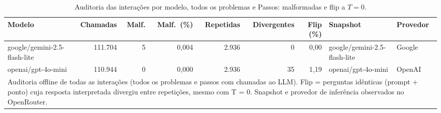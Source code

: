 \begin{table}[htbp]
\centering
\small
\caption{Auditoria das interações por modelo, todos os problemas e Passos: malformadas e flip a $T=0$.}
\label{tab:final_auditoria_por_modelo}
\begin{tabular}{lrrrrrrll}
\toprule
Modelo & Chamadas & Malf. & Malf.\ (\%) & Repetidas & Divergentes & Flip (\%) & Snapshot & Provedor \\
\midrule
google/gemini-2.5-flash-lite & 111.704 & 5 & 0,004 & 2.936 & 0 & 0,00 & google/gemini-2.5-flash-lite & Google \\
openai/gpt-4o-mini & 110.944 & 0 & 0,000 & 2.936 & 35 & 1,19 & openai/gpt-4o-mini & OpenAI \\
\bottomrule
\multicolumn{9}{p{0.95\linewidth}}{\footnotesize Auditoria offline de todas as interações (todos os problemas e passos com chamadas ao LLM). Flip = perguntas idênticas (prompt + ponto) cuja resposta interpretada divergiu entre repetições, mesmo com T = 0. Snapshot e provedor de inferência observados no OpenRouter.} \\
\end{tabular}
\end{table}
